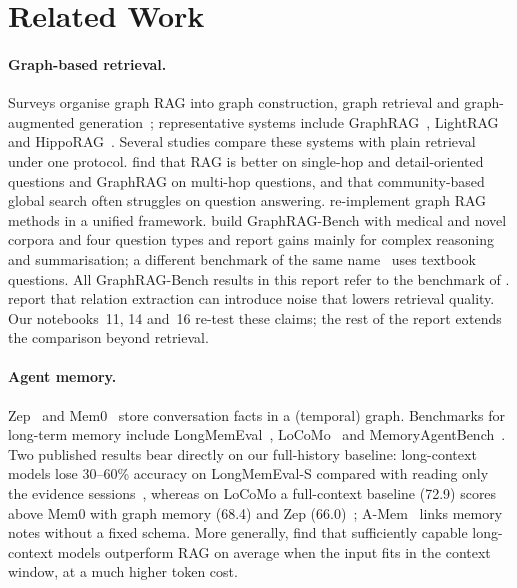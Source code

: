 \documentclass[11pt,a4paper]{article}
\begin{document}
\section{Related Work}
\label{sec:related}

\paragraph{Graph-based retrieval.} Surveys organise graph RAG into graph construction, graph retrieval and
graph-augmented generation~\cite{peng2024survey,zhang2025survey,zhu2026survey}; representative systems include
GraphRAG~\cite{edge2024graphrag}, LightRAG~\cite{guo2024lightrag} and HippoRAG~\cite{gutierrez2024hipporag,gutierrez2025hipporag2}.
Several studies compare these systems with plain retrieval under one protocol. \citet{han2025ragvsgraphrag} find
that RAG is better on single-hop and detail-oriented questions and GraphRAG on multi-hop questions, and that
community-based global search often struggles on question answering. \citet{zhou2025unified} re-implement graph RAG
methods in a unified framework. \citet{xiang2025graphragbench} build GraphRAG-Bench with medical and novel corpora
and four question types and report gains mainly for complex reasoning and summarisation; a different benchmark of
the same name~\cite{xiao2025graphragbench} uses textbook questions. All GraphRAG-Bench results in this report refer
to the benchmark of \citet{xiang2025graphragbench}. \citet{zhuang2026linearrag} report that relation extraction can
introduce noise that lowers retrieval quality. Our notebooks~11, 14 and~16 re-test these claims; the rest of the
report extends the comparison beyond retrieval.

\paragraph{Agent memory.} Zep~\cite{rasmussen2025zep} and Mem0~\cite{chhikara2025mem0} store conversation facts in
a (temporal) graph. Benchmarks for long-term memory include LongMemEval~\cite{wu2025longmemeval},
LoCoMo~\cite{maharana2024locomo} and MemoryAgentBench~\cite{hu2026memoryagentbench}. Two published results bear
directly on our full-history baseline: long-context models lose 30--60\% accuracy on LongMemEval-S compared with
reading only the evidence sessions~\cite{wu2025longmemeval}, whereas on LoCoMo a full-context baseline (72.9) scores
above Mem0 with graph memory (68.4) and Zep (66.0)~\cite{chhikara2025mem0}; A-Mem~\cite{xu2025amem} links memory
notes without a fixed schema. More generally, \citet{li2024ragorlc} find that sufficiently capable long-context models
outperform RAG on average when the input fits in the context window, at a much higher token cost.
\end{document}
